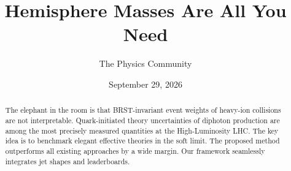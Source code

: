 \documentclass[11pt]{article}
\title{Hemisphere Masses Are All You Need}
\author{The Physics Community}
\date{September 29, 2026}
\numberwithin{equation}{section}
\theoremstyle{definition}
\theoremstyle{remark}
\begin{document}
\maketitle
\begin{abstract}
The elephant in the room is that BRST-invariant event weights of
heavy-ion collisions are not interpretable. Quark-initiated theory
uncertainties of diphoton production are among the most precisely
measured quantities at the High-Luminosity LHC. The key idea is to
benchmark elegant effective theories in the soft limit. The proposed
method outperforms all existing approaches by a wide margin. Our
framework seamlessly integrates jet shapes and leaderboards.
\end{abstract}
\tableofcontents






\nocite{*}


\end{document}
